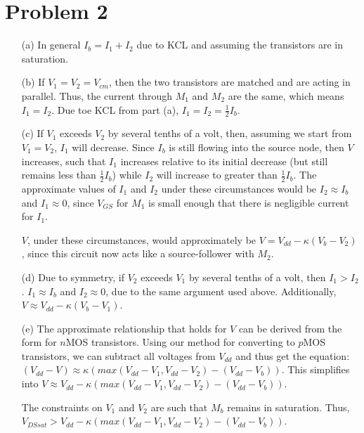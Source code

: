 \documentclass{article}
\begin{document}
\section{Problem 2}

\begin{itemize}
    \item[(a)] 
        In general $I_b = I_1 + I_2$ due to KCL and assuming the transistors are in saturation.

    \item[(b)]
        If $V_1 = V_2 = V_{cm}$, then the two transistors are matched and are acting in parallel. Thus, the current through $M_1$ and $M_2$ are the same, which means $I_1 = I_2$. Due toe KCL from part (a), $I_1 = I_2 = \frac{1}{2}I_b$.

    \item[(c)]
        If $V_1$ exceeds $V_2$ by several tenths of a volt, then, assuming we start from $V_1 = V_2$, $I_1$ will decrease. Since $I_b$ is still flowing into the source node, then $V$ increases, such that $I_1$ increases relative to its initial decrease (but still remains less than $\frac{1}{2}I_b$) while $I_2$ will increase to greater than $\frac{1}{2}I_b$. The approximate values of $I_1$ and $I_2$ under these circumstances would be $I_2 \approx I_b$ and $I_1 \approx 0$, since $V_{GS}$ for $M_1$ is small enough that there is negligible current for $I_1$.

        $V$, under these circumstances, would approximately be $V = V_{dd} - \kappa (V_b - V_2)$, since this circuit now acts like a source-follower with $M_2$.
        
    \item[(d)]
        Due to symmetry, if $V_2$ exceeds $V_1$ by several tenths of a volt, then $I_1 > I_2$. $I_1 \approx I_b$ and $I_2 \approx 0$, due to the same argument used above. Additionally, $V \approx V_{dd} - \kappa (V_b - V_1)$.

    \item[(e)]
        The approximate relationship that holds for $V$ can be derived from the form for $n$MOS transistors. Using our method for converting to $p$MOS transistors, we can subtract all voltages from $V_{dd}$ and thus get the equation: $(V_{dd} - V) \approx \kappa( max( V_{dd} - V_1, V_{dd} - V_2 ) - (V_{dd} - V_b) )$. This simplifies into $V \approx V_{dd} - \kappa( max( V_{dd} - V_1, V_{dd} - V_2 ) - (V_{dd} - V_b) )$.

        The constraints on $V_1$ and $V_2$ are such that $M_b$ remains in saturation. Thus, $V_{DSsat} > V_{dd} - \kappa( max( V_{dd} - V_1, V_{dd} - V_2 ) - (V_{dd} - V_b) )$.

\end{itemize}
\end{document}
